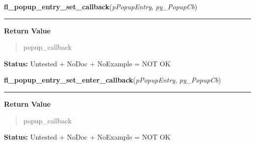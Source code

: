 \hspace{.8\funcindent}\begin{boxedminipage}{\funcwidth}

    \raggedright \textbf{fl\_popup\_entry\_set\_callback}(\textit{pPopupEntry}, \textit{py\_PopupCb})

    \vspace{-1.5ex}

    \rule{\textwidth}{0.5\fboxrule}
\setlength{\parskip}{2ex}
\setlength{\parskip}{1ex}
      \textbf{Return Value}
    \vspace{-1ex}

      \begin{quote}
      popup\_callback

      \end{quote}

\textbf{Status:} Untested + NoDoc + NoExample = NOT OK



    \end{boxedminipage}

    \label{xformslib:library:fl_popup_entry_set_enter_callback}

    \vspace{0.5ex}

\hspace{.8\funcindent}\begin{boxedminipage}{\funcwidth}

    \raggedright \textbf{fl\_popup\_entry\_set\_enter\_callback}(\textit{pPopupEntry}, \textit{py\_PopupCb})

    \vspace{-1.5ex}

    \rule{\textwidth}{0.5\fboxrule}
\setlength{\parskip}{2ex}
\setlength{\parskip}{1ex}
      \textbf{Return Value}
    \vspace{-1ex}

      \begin{quote}
      popup\_callback

      \end{quote}

\textbf{Status:} Untested + NoDoc + NoExample = NOT OK



    \end{boxedminipage}

    \label{xformslib:library:fl_popup_entry_set_leave_callback}

